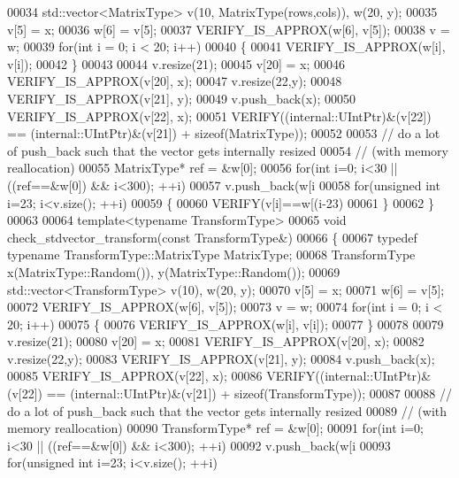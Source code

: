\begin{DoxyCode}
00034   std::vector<MatrixType> v(10, MatrixType(rows,cols)), w(20, y);
00035   v[5] = x;
00036   w[6] = v[5];
00037   VERIFY\_IS\_APPROX(w[6], v[5]);
00038   v = w;
00039   \textcolor{keywordflow}{for}(\textcolor{keywordtype}{int} i = 0; i < 20; i++)
00040   \{
00041     VERIFY\_IS\_APPROX(w[i], v[i]);
00042   \}
00043 
00044   v.resize(21);
00045   v[20] = x;
00046   VERIFY\_IS\_APPROX(v[20], x);
00047   v.resize(22,y);
00048   VERIFY\_IS\_APPROX(v[21], y);
00049   v.push\_back(x);
00050   VERIFY\_IS\_APPROX(v[22], x);
00051   VERIFY((internal::UIntPtr)&(v[22]) == (internal::UIntPtr)&(v[21]) + \textcolor{keyword}{sizeof}(MatrixType));
00052 
00053   \textcolor{comment}{// do a lot of push\_back such that the vector gets internally resized}
00054   \textcolor{comment}{// (with memory reallocation)}
00055   MatrixType* ref = &w[0];
00056   \textcolor{keywordflow}{for}(\textcolor{keywordtype}{int} i=0; i<30 || ((ref==&w[0]) && i<300); ++i)
00057     v.push\_back(w[i%
00058   \textcolor{keywordflow}{for}(\textcolor{keywordtype}{unsigned} \textcolor{keywordtype}{int} i=23; i<v.size(); ++i)
00059   \{
00060     VERIFY(v[i]==w[(i-23)%
00061   \}
00062 \}
00063 
00064 \textcolor{keyword}{template}<\textcolor{keyword}{typename} TransformType>
00065 \textcolor{keywordtype}{void} check\_stdvector\_transform(\textcolor{keyword}{const} TransformType&)
00066 \{
00067   \textcolor{keyword}{typedef} \textcolor{keyword}{typename} TransformType::MatrixType MatrixType;
00068   TransformType x(MatrixType::Random()), y(MatrixType::Random());
00069   std::vector<TransformType> v(10), w(20, y);
00070   v[5] = x;
00071   w[6] = v[5];
00072   VERIFY\_IS\_APPROX(w[6], v[5]);
00073   v = w;
00074   \textcolor{keywordflow}{for}(\textcolor{keywordtype}{int} i = 0; i < 20; i++)
00075   \{
00076     VERIFY\_IS\_APPROX(w[i], v[i]);
00077   \}
00078 
00079   v.resize(21);
00080   v[20] = x;
00081   VERIFY\_IS\_APPROX(v[20], x);
00082   v.resize(22,y);
00083   VERIFY\_IS\_APPROX(v[21], y);
00084   v.push\_back(x);
00085   VERIFY\_IS\_APPROX(v[22], x);
00086   VERIFY((internal::UIntPtr)&(v[22]) == (internal::UIntPtr)&(v[21]) + \textcolor{keyword}{sizeof}(TransformType));
00087 
00088   \textcolor{comment}{// do a lot of push\_back such that the vector gets internally resized}
00089   \textcolor{comment}{// (with memory reallocation)}
00090   TransformType* ref = &w[0];
00091   \textcolor{keywordflow}{for}(\textcolor{keywordtype}{int} i=0; i<30 || ((ref==&w[0]) && i<300); ++i)
00092     v.push\_back(w[i%
00093   \textcolor{keywordflow}{for}(\textcolor{keywordtype}{unsigned} \textcolor{keywordtype}{int} i=23; i<v.size(); ++i)

\end{DoxyCode}
